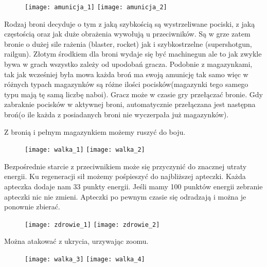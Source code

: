 \documentclass[licencjacka]{pracamgr}
\begin{document}
\begin{figure}[htb]
\begin{center}
\texttt{[image: amunicja\_1]}
\texttt{[image: amunicja\_2]}
\end{center}
\end{figure}

Rodzaj broni decyduje o tym z jaką szybkością są wystrzeliwane pociski,
z jaką częstością oraz jak duże obrażenia wywołują u przeciwników.
Są w grze zatem bronie o dużej sile rażenia (blaster, rocket) jak i szybkostrzelne
(supershotgun, railgun). Złotym środkiem dla broni wydaje się być machinegun ale
to jak zwykle bywa w grach wszystko zależy od upodobań gracza.
Podobnie z magazynkami, tak jak wcześniej była mowa każda broń ma swoją amunicję
tak samo więc w różnych typach magazynków są różne ilości
pocisków(magazynki tego samego typu mają tę samą liczbę naboi). Gracz może w czasie gry
przełączać bronie. Gdy zabraknie pocisków w aktywnej broni, automatycznie przełączana jest
następna broń(o ile każda z posiadanych broni nie wyczerpała już magazynków).

Z bronią i pełnym magazynkiem możemy ruszyć do boju.

\begin{figure}[htb]
\begin{center}
\texttt{[image: walka\_1]}
\texttt{[image: walka\_2]}
\end{center}
\end{figure}

Bezpośrednie starcie z przeciwnikiem może się przyczynić do znacznej utraty
energii. Ku regeneracji sił możemy pośpieszyć do najbliższej apteczki.
Każda apteczka dodaje nam 33 punkty energii. Jeśli mamy 100 punktów energii zebranie
apteczki nic nie zmieni. Apteczki po pewnym czasie się odradzają i można je ponownie zbierać.

\begin{figure}[htb]
\begin{center}
\texttt{[image: zdrowie\_1]}
\texttt{[image: zdrowie\_2]}
\end{center}
\end{figure}

Można atakować z ukrycia, urzywając zoomu.

\begin{figure}[htb]
\begin{center}
\texttt{[image: walka\_3]}
\texttt{[image: walka\_4]}
\end{center}
\end{figure}
\end{document}
